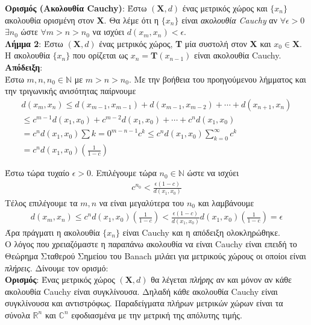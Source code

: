 \documentclass[11pt]{article} %
\numberwithin{equation}{subsection}
\begin{document}
\textbf{Ορισμός (Ακολουθία Cauchy)}: Έστω $(\textbf{X}, d)$ ένας μετρικός χώρος και $\{x_n\}$ ακολουθία ορισμένη στον \textbf{X}. Θα λέμε ότι η $\{x_n\}$ είναι \textit{ακολουθία Cauchy} αν $\forall \epsilon > 0$ $\exists n_{0}$ ώστε $\forall m > n > n_{0}$ να ισχύει $d(x_{m}, x_{n}) < \epsilon$.\\

\textbf{Λήμμα 2}:  Έστω $(\textbf{X}, d)$ ένας μετρικός χώρος, \textbf{T} μία συστολή στον \textbf{X} και $x_{0} \in \textbf{X}$. Η ακολουθία  $\{x_n\}$ που ορίζεται ως $x_{n} = \textbf{T}(x_{n-1})$ είναι ακολουθία Cauchy.\\
\textbf{Απόδειξη}:\\
Έστω $m,n,n_{0} \in \mathbb{N}$ με $m > n > n_{0}$. Με την βοήθεια του προηγούμενου λήμματος και την τριγωνικής ανισότητας παίρνουμε
\begin{align*}
d(x_{m}, x_{n}) \leq d(x_{m-1}, x_{m-1}) + d(x_{m-1}, x_{m-2}) + \cdots + d(x_{n+1}, x_{n})\\
\leq c^{m-1} d(x_{1}, x_{0}) + c^{m-2} d(x_{1}, x_{0}) + \cdots + c^{n} d(x_{1}, x_{0})\\
\displaystyle = c^{n} d(x_{1}, x_{0}) \sum{k=0}^{m-n-1} c^{k} \leq c^{n} d(x_{1}, x_{0}) \sum_{k=0}^{\infty} c^{k}\\
= c^{n} d(x_{1}, x_{0}) \left(\frac{1}{1-c}\right)
\end{align*}

Έστω τώρα τυχαίο $\epsilon > 0$. Επιλέγουμε τώρα $n_{0} \in \mathbb{N}$ ώστε να ισχύει
\begin{align*}
c^{n_{0}} < \frac{\epsilon(1-c)}{d(x_{1}, x_{0})}
\end{align*}
Τέλος επιλέγουμε τα $m,n$ να είναι μεγαλύτερα του $n_{0}$ και λαμβάνουμε
\begin{align*}
d(x_{m}, x_{n}) \leq c^{n}d(x_{1}, x_{0})\left(\frac{1}{1-c}\right) < \frac{\epsilon(1-c)}{d(x_{1}, x_{0})}d(x_{1}, x_{0})\left(\frac{1}{1-c}\right) = \epsilon
\end{align*}
Άρα πράγματι η ακολουθία  $\{x_n\}$ είναι Cauchy και η απόδειξη ολοκληρώθηκε.\\

Ο λόγος που χρειαζόμαστε η παραπάνω ακολουθία να είναι Cauchy είναι επειδή το Θεώρημα Σταθερού Σημείου του Banach μιλάει για μετρικούς χώρους οι οποίοι είναι \textit{πλήρεις}. Δίνουμε τον ορισμό:\\

\textbf{Ορισμός}: Ένας μετρικός χώρος $(\textbf{X}, d)$ θα λέγεται \textit{πλήρης} αν και μόνον αν κάθε ακολουθία Cauchy είναι συγκλίνουσα. Δηλαδή κάθε ακολουθία Cauchy είναι συγκλίνουσα και αντιστρόφως. Παραδείγματα πλήρων μετρικών χώρων είναι τα σύνολα $\mathbb{R}^{n}$ και $\mathbb{C}^{n}$ εφοδιασμένα με την μετρική της απόλυτης τιμής.\\
\end{document}
